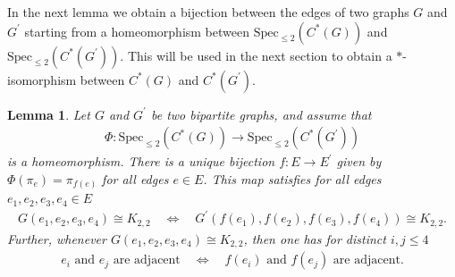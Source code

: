 \documentclass[a4paper]{amsart}
\newtheorem{lemma}[thm]{Lemma}
\begin{document}
In the next lemma we obtain a bijection between the edges of two graphs $G$ and $G^\prime$ starting from a homeomorphism between $\mathrm{Spec}_{\leq 2}(C^\ast(G))$ and $\mathrm{Spec}_{\leq 2}(C^\ast(G^\prime))$. This will be used in the next section to obtain a $\ast$-isomorphism between $C^\ast(G)$ and $C^\ast(G^\prime)$.

\begin{lemma}
    \label{reps::lemma:edge_bijection_f_from_homeomorphism_of_spectrum}
    Let $G$ and $G^\prime$ be two bipartite graphs, and assume that
    \begin{align*}
        \Phi: \mathrm{Spec}_{\leq 2}(C^\ast(G)) \to \mathrm{Spec}_{\leq 2}(C^\ast(G^\prime))
    \end{align*}
    is a homeomorphism. 
    There is a unique bijection $f: E \to E^\prime$ given by $\Phi(\pi_e) = \pi_{f(e)}$ for all edges $e \in E$.
    This map satisfies for all edges $e_1, e_2, e_3, e_4 \in E$ 
    \begin{align}
        \label{reps::eq:f_preserves_K22_subgraphs}
        G(e_1, e_2, e_3, e_4) \cong K_{2,2}
        \quad\Leftrightarrow\quad
        G^\prime(f(e_1), f(e_2), f(e_3), f(e_4)) \cong K_{2,2}.
    \end{align}
    Further, whenever $G(e_1, e_2, e_3, e_4) \cong K_{2,2}$, then one has for distinct $i, j \leq 4$ 
    \begin{align}
        \label{reps::eq:f_preserves_adjacency}
        e_i \text{ and } e_j \text{ are adjacent} \quad\Leftrightarrow\quad f(e_i) \text{ and } f(e_j) \text{ are adjacent}.
    \end{align}
\end{lemma}
\end{document}
